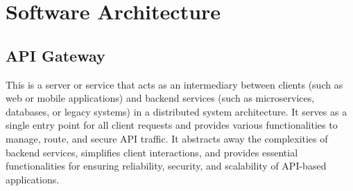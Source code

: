 \documentclass{article}
\begin{document}
\section{Software Architecture}
\subsection{API Gateway}
This is a server or service that acts as an intermediary between clients (such as web or mobile applications) and backend services (such as microservices, databases, or legacy systems) in a distributed system architecture. It serves as a single entry point for all client requests and provides various functionalities to manage, route, and secure API traffic. It abstracts away the complexities of backend services, simplifies client interactions, and provides essential functionalities for ensuring reliability, security, and scalability of API-based applications.
\end{document}
